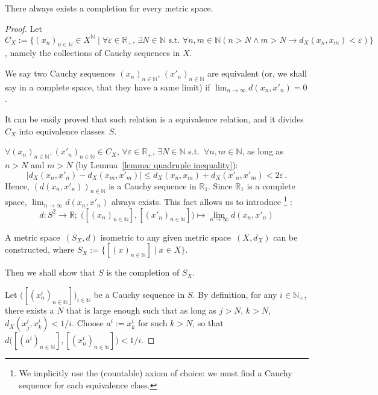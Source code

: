 \documentclass[openany]{book}
\begin{document}
\begin{theorem}\label{theorem: completion exists}
	There always exists a completion for every metric space.
\end{theorem}
\begin{proof}
	Let $C_X := \{(x_n)_{n \in \mathbb N} \in X^\mathbb N \mid \forall \varepsilon \in \mathbb R_+,\, \exists N \in \mathbb N \text{ s.t. } \forall n, m \in \mathbb N (n > N \wedge m > N \to d_X(x_n, x_m) < \varepsilon)\}$, namely the collections of Cauchy sequences in $X$. 

	We say two Cauchy sequences $(x_n)_{n \in \mathbb N}$, $(x'_n)_{n \in \mathbb N}$ are equivalent (or, we shall say in a complete space, that they have a same limit) if $\lim_{n \to \infty} d(x_n, x'_n) = 0$. 

	It can be easily proved that such relation is a equivalence relation, and it divides $C_X$ into equivalence classes~$S$. 

	$\forall (x_n)_{n \in \mathbb N}, (x'_n)_{n \in \mathbb N} \in C_X$, $\forall \varepsilon \in \mathbb R_+$, $\exists N \in \mathbb N$ s.t.\ $\forall n, m \in \mathbb N$, as long as $n > N$ and $m > N$ (by Lemma~\ref{lemma: quadruple inequality}):
	\begin{equation*}
		|d_X(x_n, x'_n) - d_X(x_m, x'_m)| \leq  d_X(x_n, x_m) + d_X(x'_n, x'_m) 
			< 2 \varepsilon\,.
	\end{equation*}
	Hence, $(d(x_n, x'_n))_{n \in \mathbb N}$ is a Cauchy sequence in $\mathbb R_1$. Since $\mathbb R_1$ is a complete space, $\lim_{n \to \infty} d(x_n, x'_n)$ always exists. This fact allows us to introduce%
		\footnote{We implicitly use the (countable) axiom of choice: we must find a Cauchy sequence for each equivalence class. }%
	:
	\begin{equation*}
		d \colon S^2 \to \mathbb R; \;
			\big([(x_n)_{n \in \mathbb N}], [(x'_n)_{n \in \mathbb N}]\big)
				\mapsto \lim_{n \to \infty} d(x_n, x'_n) 
	\end{equation*}

	A metric space~$(S_X, d)$ isometric to any given metric space~$(X, d_X)$ can be constructed, where $S_X := \{[(x)_{n \in \mathbb N}] \mid x \in X\}$.

	Then we shall show that $S$ is the completion of $S_X$. 

	Let $\big([(x^i_n)_{n \in \mathbb N}]\big)_{i \in \mathbb N}$ be a Cauchy sequence in $S$. 
	By definition, for any $i \in \mathbb N_+$, there exists a $N$ that is large enough such that as long as $j> N$, $k > N$, $d_X(x^i_j, x^i_k) < 1/i$. 
	Choose $a^i := x^i_k$ for such $k > N$, so that $d \big([(a^i)_{n \in \mathbb N}], [(x^i_n)_{n \in \mathbb N}]\big) < 1/i$. 
	

\end{proof}
\end{document}

